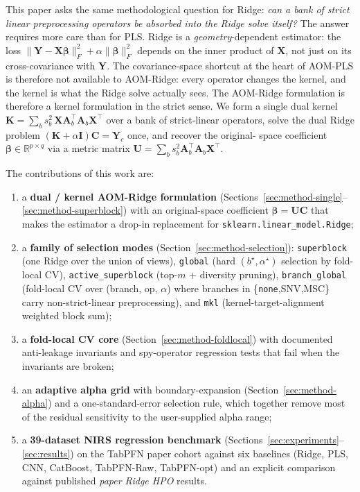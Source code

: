 \documentclass[11pt,a4paper]{article}
\newcommand{\R}{\mathbb{R}}
\newcommand{\identity}{\mathbf{I}}
\newcommand{\Xmat}{\mathbf{X}}
\newcommand{\Ymat}{\mathbf{Y}}
\newcommand{\Yc}{\mathbf{Y}_{\!c}}
\newcommand{\Amat}{\mathbf{A}}
\newcommand{\Kmat}{\mathbf{K}}
\newcommand{\Umat}{\mathbf{U}}
\newcommand{\Cmat}{\mathbf{C}}
\newcommand{\PLS}{\textsc{PLS}\xspace}
\newcommand{\SNV}{\textsc{SNV}\xspace}
\newcommand{\MSC}{\textsc{MSC}\xspace}
\begin{document}
This paper asks the same methodological question for Ridge: \emph{can
a bank of strict linear preprocessing operators be absorbed into the
Ridge solve itself?} The answer requires more care than for \PLS.
Ridge is a \emph{geometry}-dependent estimator: the loss
$\|\Ymat-\Xmat\bm\beta\|_F^2+\alpha\|\bm\beta\|_F^2$ depends on the
inner product of $\Xmat$, not just on its cross-covariance with
$\Ymat$. The covariance-space shortcut at the heart of AOM-PLS is
therefore not available to AOM-Ridge: every operator changes the
kernel, and the kernel is what the Ridge solve actually sees. The
AOM-Ridge formulation is therefore a kernel formulation in the strict
sense. We form a single dual kernel
$\Kmat=\sum_b s_b^2\,\Xmat\Amat_b^\top\Amat_b\Xmat^\top$ over a bank
of strict-linear operators, solve the dual Ridge problem
$(\Kmat+\alpha\identity)\Cmat=\Yc$ once, and recover the original-
space coefficient $\bm\beta\in\R^{p\times q}$ via a metric matrix
$\Umat=\sum_b s_b^2\Amat_b^\top\Amat_b\Xmat^\top$.

The contributions of this work are:
\begin{enumerate}[leftmargin=2em,label=(\arabic*)]
  \item a \textbf{dual / kernel AOM-Ridge formulation}
        (Sections~\ref{sec:method-single}--\ref{sec:method-superblock})
        with an original-space coefficient $\bm\beta=\Umat\Cmat$ that
        makes the estimator a drop-in replacement for
        \texttt{sklearn.linear\_model.Ridge};
  \item a \textbf{family of selection modes}
        (Section~\ref{sec:method-selection}): \texttt{superblock} (one
        Ridge over the union of views), \texttt{global} (hard
        $(b^\star,\alpha^\star)$ selection by fold-local CV),
        \texttt{active\_superblock} (top-$m$ + diversity pruning),
        \texttt{branch\_global} (fold-local CV over (branch, op,
        $\alpha$) where branches in
        \{\texttt{none},\SNV,\MSC\} carry non-strict-linear
        preprocessing), and \texttt{mkl} (kernel-target-alignment
        weighted block sum);
  \item a \textbf{fold-local CV core}
        (Section~\ref{sec:method-foldlocal}) with documented
        anti-leakage invariants and spy-operator regression tests that
        fail when the invariants are broken;
  \item an \textbf{adaptive alpha grid} with boundary-expansion
        (Section~\ref{sec:method-alpha}) and a one-standard-error
        selection rule, which together remove most of the residual
        sensitivity to the user-supplied alpha range;
  \item a \textbf{39-dataset NIRS regression benchmark}
        (Sections~\ref{sec:experiments}--\ref{sec:results}) on the
        TabPFN paper cohort against six baselines (Ridge, \PLS, CNN,
        CatBoost, TabPFN-Raw, TabPFN-opt) and an explicit comparison
        against published \emph{paper Ridge HPO} results.
\end{enumerate}
\end{document}

